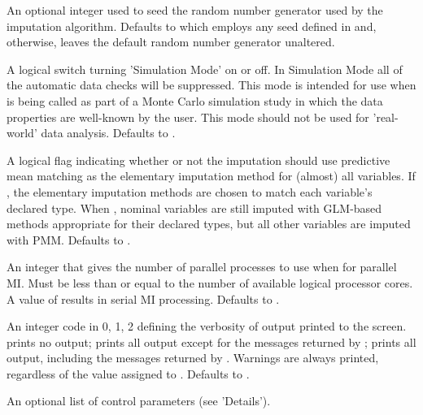 \documentclass[letterpaper]{book}
\begin{document}
\begin{Arguments}
\begin{ldescription}
\item[\code{seed}] 
An optional integer used to seed the random number generator used by the
imputation algorithm. Defaults to  which employs
any seed defined in  and, otherwise, leaves the
default random number generator unaltered.

\item[\code{simMode}] 
A logical switch turning 'Simulation Mode' on or off. In Simulation
Mode all of the automatic data checks will be suppressed. This mode
is intended for use when  is being called as part of a
Monte Carlo simulation study in which the data properties are
well-known by the user. This mode should not be used for
'real-world' data analysis. Defaults to .

\item[\code{forcePmm}] 
A logical flag indicating whether or not the imputation should use
predictive mean matching as the elementary imputation method for
(almost) all variables. If , the elementary
imputation methods are chosen to match each variable's declared
type. When , nominal variables are still
imputed with GLM-based methods appropriate for their declared types,
but all other variables are imputed with PMM. Defaults to
.

\item[\code{nProcess}] 
An integer that gives the number of parallel processes to use when
for parallel MI. Must be less than or equal to the number
of available logical processor cores. A value of  results in serial MI processing. Defaults to .

\item[\code{verbose}] 
An integer code in 0, 1, 2 defining the verbosity of output printed to the
screen.  prints no output; 
prints all output except for the messages returned by ;
 prints all output, including the messages
returned by . Warnings are always printed, regardless of the value
assigned to . Defaults to .

\item[\code{control}] 
An optional list of control parameters (see 'Details').

\end{ldescription}
\end{Arguments}
%
\end{document}

